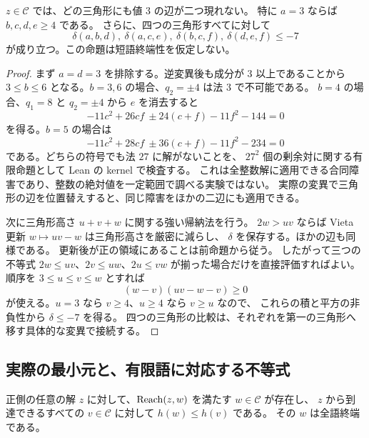 \begin{lemma}[整数性による三角形の強い制約]
\label{bp:pos-triangle}
\leanok
$z\in\mathcal C$ では、どの三角形にも値 $3$ の辺が二つ現れない。
特に $a=3$ ならば $b,c,d,e\geq4$ である。
さらに、四つの三角形すべてに対して
\[
 \delta(a,b,d),\ \delta(a,c,e),\ \delta(b,c,f),\ \delta(d,e,f)\leq-7
 \tag{T}
\]
が成り立つ。この命題は短語終端性を仮定しない。
\end{lemma}

\begin{proof}
\leanok
まず $a=d=3$ を排除する。逆変異後も成分が $3$ 以上であることから
$3\leq b\leq6$ となる。$b=3,6$ の場合、$q_2=\pm4$ は法 $3$ で不可能である。
$b=4$ の場合、$q_1=8$ と $q_2=\pm4$ から $e$ を消去すると
\[
 -11c^2+26cf\ \pm24(c+f)-11f^2-144=0
\]
を得る。$b=5$ の場合は
\[
 -11c^2+28cf\ \pm36(c+f)-11f^2-234=0
\]
である。どちらの符号でも法 $27$ に解がないことを、
$27^2$ 個の剰余対に関する有限命題として Lean の kernel で検査する。
これは全整数解に適用できる合同障害であり、整数の絶対値を一定範囲で調べる実験ではない。
実際の変異で三角形の辺を位置替えすると、同じ障害をほかの二辺にも適用できる。

次に三角形高さ $u+v+w$ に関する強い帰納法を行う。
$2w>uv$ ならば Vieta 更新 $w\mapsto uv-w$ は三角形高さを厳密に減らし、
$\delta$ を保存する。ほかの辺も同様である。
更新後が正の領域にあることは前命題から従う。
したがって三つの不等式 $2w\leq uv$、$2v\leq uw$、$2u\leq vw$
が揃った場合だけを直接評価すればよい。
順序を $3\leq u\leq v\leq w$ とすれば
\[
 (w-v)(uv-w-v)\geq0
\]
が使える。$u=3$ なら $v\geq4$、$u\geq4$ なら $v\geq u$ なので、
これらの積と平方の非負性から $\delta\leq-7$ を得る。
四つの三角形の比較は、それぞれを第一の三角形へ移す具体的な変異で接続する。
\end{proof}

\subsection{実際の最小元と、有限語に対応する不等式}

\begin{proposition}[正側の軌道における最小高さ]
\label{bp:pos-minimum}
\leanok
正側の任意の解 $z$ に対して、$\operatorname{Reach}(z,w)$ を満たす $w\in\mathcal C$ が存在し、
$z$ から到達できるすべての $v\in\mathcal C$ に対して $h(w)\leq h(v)$ である。
その $w$ は全語終端である。
\end{proposition}

